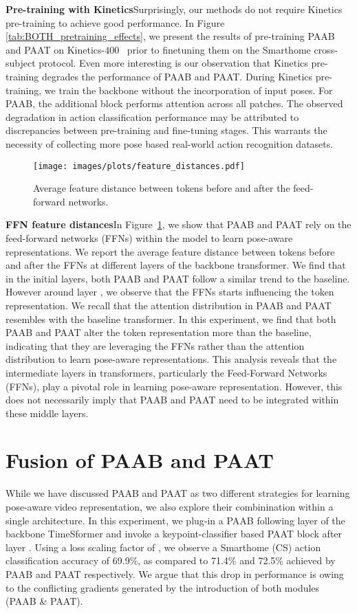 \documentclass{article}
\begin{document}
\textbf{Pre-training with Kinetics}\quad Surprisingly, our methods do not require Kinetics pre-training to achieve good performance. In Figure \ref{tab:BOTH_pretraining_effects}, we present the results of pre-training PAAB and PAAT on Kinetics-400~\cite{kinetics} prior to finetuning them on the Smarthome cross-subject protocol. Even more interesting is our observation that Kinetics pre-training degrades the performance of PAAB and PAAT. During Kinetics pre-training, we train the backbone without the incorporation of input poses. For PAAB, the additional block performs attention across all patches. The observed degradation in action classification performance may be attributed to discrepancies between pre-training and fine-tuning stages. This warrants the necessity of collecting more pose based real-world action recognition datasets. 


\begin{figure}
    \centering
    \texttt{[image: images/plots/feature\_distances.pdf]}
    \caption{Average feature distance between tokens before and after the feed-forward networks.}
    \label{fig:ffn_analysis}
\end{figure}

\textbf{FFN feature distances}\quad In Figure~\ref{fig:ffn_analysis}, we show that PAAB and PAAT rely on the feed-forward networks (FFNs) within the model to learn pose-aware representations. We report the average feature distance between tokens before and after the FFNs at different layers of the backbone transformer. We find that in the initial layers, both PAAB and PAAT follow a similar trend to the baseline. However around layer , we observe that the FFNs starts influencing the token representation. We recall that the attention distribution in PAAB and PAAT resembles with the baseline transformer. In this experiment, we find that both PAAB and PAAT alter the token representation more than the baseline, indicating that they are leveraging the FFNs rather than the attention distribution to learn pose-aware representations. This analysis reveals that the intermediate layers in transformers, particularly the Feed-Forward Networks (FFNs), play a pivotal role in learning pose-aware representation. However, this does not necessarily imply that PAAB and PAAT need to be integrated within these middle layers.


\section{Fusion of PAAB and PAAT}
While we have discussed PAAB and PAAT as two different strategies for learning pose-aware video representation, we also explore their combinination within a single architecture. In this experiment, we plug-in a PAAB following layer  of the backbone TimeSformer and invoke a keypoint-classifier based PAAT block after layer . Using a loss scaling factor of , we observe a Smarthome (CS) action classification accuracy of 69.9\%, as compared to 71.4\% and 72.5\% achieved by PAAB and PAAT respectively. We argue that this drop in performance is owing to the conflicting gradients generated by the introduction of both modules (PAAB \& PAAT). 
\end{document}

